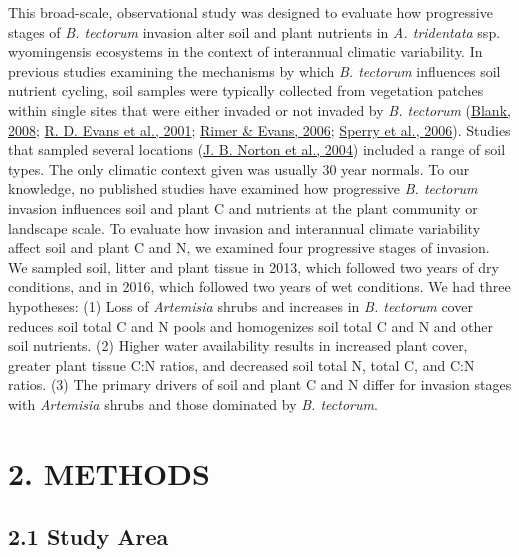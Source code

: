 \documentclass[
  11pt,
  a4paper,
]{article}
\begin{document}
This broad-scale, observational study was designed to evaluate how progressive stages of \emph{B. tectorum} invasion alter soil and plant nutrients in \emph{A. tridentata} ssp. wyomingensis ecosystems in the context of interannual climatic variability. In previous studies examining the mechanisms by which \emph{B. tectorum} influences soil nutrient cycling, soil samples were typically collected from vegetation patches within single sites that were either invaded or not invaded by \emph{B. tectorum} (\protect\hyperlink{ref-Blank2008}{Blank, 2008}; \protect\hyperlink{ref-Evans2001}{R. D. Evans et al., 2001}; \protect\hyperlink{ref-Rimer2006}{Rimer \& Evans, 2006}; \protect\hyperlink{ref-Sperry2006}{Sperry et al., 2006}). Studies that sampled several locations (\protect\hyperlink{ref-Norton2004}{J. B. Norton et al., 2004}) included a range of soil types. The only climatic context given was usually 30 year normals. To our knowledge, no published studies have examined how progressive \emph{B. tectorum} invasion influences soil and plant C and nutrients at the plant community or landscape scale. To evaluate how invasion and interannual climate variability affect soil and plant C and N, we examined four progressive stages of invasion. We sampled soil, litter and plant tissue in 2013, which followed two years of dry conditions, and in 2016, which followed two years of wet conditions. We had three hypotheses: (1) Loss of \emph{Artemisia} shrubs and increases in \emph{B. tectorum} cover reduces soil total C and N pools and homogenizes soil total C and N and other soil nutrients. (2) Higher water availability results in increased plant cover, greater plant tissue C:N ratios, and decreased soil total N, total C, and C:N ratios. (3) The primary drivers of soil and plant C and N differ for invasion stages with \emph{Artemisia} shrubs and those dominated by \emph{B. tectorum}.

\hypertarget{methods}{%
\section{2. METHODS}\label{methods}}

\hypertarget{study-area}{%
\subsection{2.1 Study Area}\label{study-area}}
\end{document}
